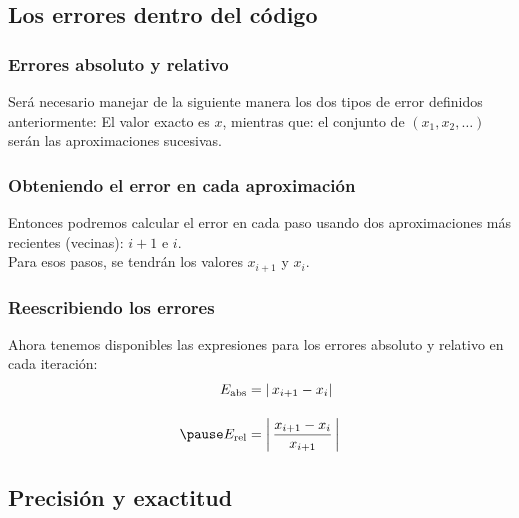 \documentclass[12pt]{beamer}
\begin{document}
\subsection{Los errores dentro del código}

\begin{frame}
\frametitle{Errores absoluto y relativo}
Será necesario manejar de la siguiente manera los dos tipos de error definidos anteriormente: \pause El valor exacto es $x$, mientras que: \pause el conjunto de $(x_{1}, x_{2}, \ldots)$ serán las aproximaciones sucesivas.
\end{frame}
\begin{frame}
\frametitle{Obteniendo el error en cada aproximación}
Entonces podremos calcular el error en cada paso usando dos aproximaciones más recientes (vecinas): $i+ 1$ e $i$.
\\
\bigskip
\pause
Para esos pasos, se tendrán los valores $x_{i+1}$ y $x_{i}$.
\end{frame}
\begin{frame}
\frametitle{Reescribiendo los errores}
Ahora tenemos disponibles las expresiones para los errores absoluto y relativo en cada iteración:
\pause
\begin{eqnarray*}
E_{\text{abs}} &= \abs{\, x_{i+1} - x_{i}} \\[1em] \pause
E_{\text{rel}} &= \abs{\, \dfrac{x_{i+1} - x_{i}}{x_{i+1}} \, } 
\end{eqnarray*}
\end{frame}

\subsection{Precisión y exactitud}
\end{document}
